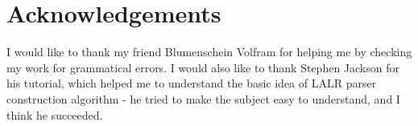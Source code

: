 \chapter*{Acknowledgements}

I would like to thank my friend Blumenschein Volfram for helping me by checking my work for grammatical errors. I would also like to thank Stephen Jackson for his tutorial, which helped me to understand the basic idea of LALR parser construction algorithm - he tried to make the subject easy to understand, and I think he succeeded.